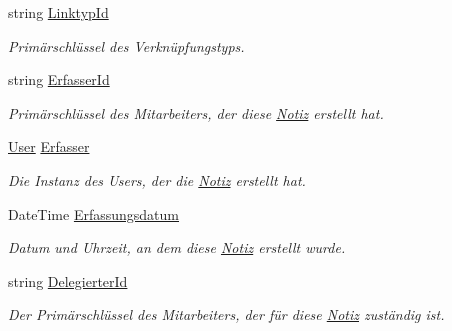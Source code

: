 \begin{DoxyCompactItemize}
\item 
string \hyperlink{class_products_1_1_model_1_1_entities_1_1_notiz_ab1ffa41c63b7812dd9a834341ce234b8}{Linktyp\+Id}
\begin{DoxyCompactList}\small\item\em Primärschlüssel des Verknüpfungstyps. \end{DoxyCompactList}\item 
string \hyperlink{class_products_1_1_model_1_1_entities_1_1_notiz_af7524a25e0f19c34bef9530f6cd01f7b}{Erfasser\+Id}
\begin{DoxyCompactList}\small\item\em Primärschlüssel des Mitarbeiters, der diese \hyperlink{class_products_1_1_model_1_1_entities_1_1_notiz}{Notiz} erstellt hat. \end{DoxyCompactList}\item 
\hyperlink{class_products_1_1_model_1_1_entities_1_1_user}{User} \hyperlink{class_products_1_1_model_1_1_entities_1_1_notiz_acef1ae96499d47660d071660da25179c}{Erfasser}
\begin{DoxyCompactList}\small\item\em Die Instanz des Users, der die \hyperlink{class_products_1_1_model_1_1_entities_1_1_notiz}{Notiz} erstellt hat. \end{DoxyCompactList}\item 
Date\+Time \hyperlink{class_products_1_1_model_1_1_entities_1_1_notiz_af97261ebbaa09fe2e3d5741830c07569}{Erfassungsdatum}
\begin{DoxyCompactList}\small\item\em Datum und Uhrzeit, an dem diese \hyperlink{class_products_1_1_model_1_1_entities_1_1_notiz}{Notiz} erstellt wurde. \end{DoxyCompactList}\item 
string \hyperlink{class_products_1_1_model_1_1_entities_1_1_notiz_a3b9a0be05c2a33d8d6d60b0ecf7f1599}{Delegierter\+Id}
\begin{DoxyCompactList}\small\item\em Der Primärschlüssel des Mitarbeiters, der für diese \hyperlink{class_products_1_1_model_1_1_entities_1_1_notiz}{Notiz} zuständig ist. \end{DoxyCompactList}\item 

\end{DoxyCompactItemize}
